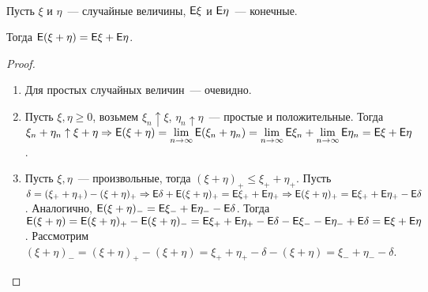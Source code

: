 \begin{property}[Аддитивность]~

	Пусть $\xi$ и $\eta$~--- случайные величины, $\mathsf{E}\xi$ и $\mathsf{E}\eta$~--- конечные. 
	
	Тогда $\mathsf{E}(\xi + \eta) = \mathsf{E}\xi + \mathsf{E}\eta$.
	\begin{proof}
	    \begin{enumerate}
    	    \item Для простых случайных величин~--- очевидно. 
    	    
    	    \item Пусть $\xi, \eta \geqslant 0$, возьмем $\xi_n \uparrow \xi$, $\eta_n \uparrow \eta$~--- простые и положительные. Тогда $\xi_n + \eta_n \uparrow \xi + \eta \Rightarrow \mathsf{E}(\xi + \eta) = \lim\limits_{n \rightarrow \infty}\mathsf{E}(\xi_n + \eta_n) = \lim\limits_{n \rightarrow \infty}\mathsf{E} \xi_n + \lim\limits_{n \rightarrow \infty} \mathsf{E}\eta_n = \mathsf{E}\xi + \mathsf{E}\eta$. 
    	    
    	    \item Пусть $\xi, \eta$~--- произвольные, тогда $(\xi + \eta)_+ \leqslant \xi_+ + \eta_+$. Пусть $\delta = (\xi_+ + \eta_+) - (\xi + \eta)_+ \Rightarrow \mathsf{E}\delta + \mathsf{E}(\xi + \eta)_+ = \mathsf{E}\xi_+ + \mathsf{E}\eta_+ \Rightarrow \mathsf{E}(\xi + \eta)_+ = \mathsf{E}\xi_+ + \mathsf{E}\eta_+ - \mathsf{E}\delta$. Аналогично, $\mathsf{E}(\xi + \eta)_- = \mathsf{E}\xi_- + \mathsf{E}\eta_- - \mathsf{E}\delta$. Тогда $\mathsf{E}(\xi + \eta) = \mathsf{E}(\xi + \eta)_+ - \mathsf{E}(\xi + \eta)_- = \mathsf{E}\xi_+ + \mathsf{E}\eta_+ - \mathsf{E}\delta - \mathsf{E}\xi_- - \mathsf{E}\eta_- + \mathsf{E} \delta = \mathsf{E}\xi + \mathsf{E}\eta$. Рассмотрим $(\xi + \eta)_- = (\xi + \eta)_+ - (\xi + \eta) = \xi_+ + \eta_+ - \delta - (\xi + \eta) = \xi_- + \eta_- - \delta$.
	    \end{enumerate}
	\end{proof}
\end{property}

